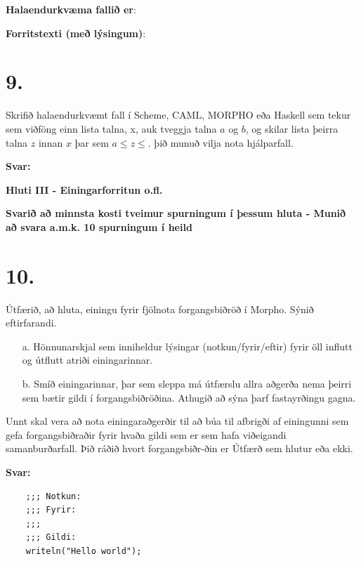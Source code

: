 \documentclass{article}
\newcommand{\sv}{\textbf{Svar:}}
\newcommand{\bo}[1]{\textbf{#1}}
\begin{document}
     \textbf{Halaendurkvæma fallið er}:


     \textbf{Forritstexti (með lýsingum)}:


     \newpage
     \section{9.}
     Skrifið halaendurkvæmt fall í Scheme, CAML, MORPHO eða Haskell
     sem tekur sem viðföng einn lista talna, x, auk tveggja talna $a$ og $b$,
     og skilar lista þeirra talna $z$ innan $x$ þar sem $a \leq z \leq$. þið munuð 
     vilja nota hjálparfall.


     \sv 




     \newpage

     \begin{center}
     \bo{Hluti III - Einingarforritun o.fl.}

     \bo{Svarið að minnsta kosti tveimur spurningum í þessum hluta - Munið að svara a.m.k. 10 spurningum í heild}
     \end{center}


     \section{10.}
     Útfærið, að hluta, einingu fyrir fjölnota forgangsbiðröð í Morpho.
     Sýnið eftirfarandi.
     \begin{itemize}
        \item[a.] Hönnunarskjal sem inniheldur lýsingar (notkun/fyrir/eftir) fyrir
                  öll influtt og útflutt atriði einingarinnar.
        \item[b.] Smíð einingarinnar, þar sem sleppa má útfærslu allra 
                  aðgerða nema þeirri sem bætir gildi í forgangsbiðröðina.
                  Athugið að sýna þarf fastayrðingu gagna.
                  
     \end{itemize}
     Unnt skal vera að nota einingaraðgerðir til að búa til afbrigði af 
     einingunni sem gefa forgangsbiðraðir fyrir hvaða gildi sem er sem
     hafa viðeigandi samanburðarfall. Þið ráðið hvort forgangsbiðr-ðin er
     Útfærð sem hlutur eða ekki.

     \sv





    \begin{lstlisting}
    ;;; Notkun:
    ;;; Fyrir:
    ;;;
    ;;; Gildi:
    writeln("Hello world");  
    \end{lstlisting}
\end{document}
